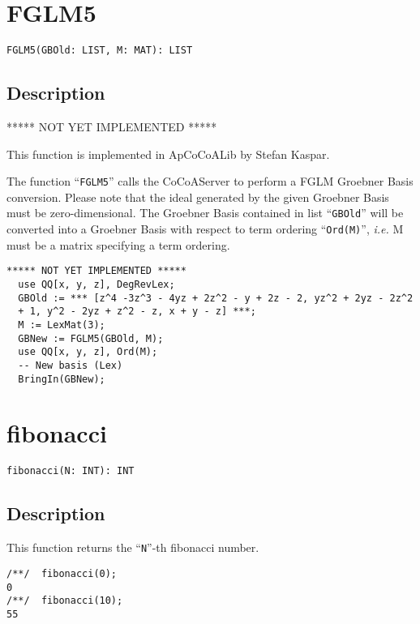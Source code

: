 \documentclass[a4paper]{mybook}
\newenvironment{command}{}{} %
\begin{document}
\section{FGLM5}
\label{FGLM5}
\begin{command} %


\begin{Verbatim}[label=syntax, rulecolor=\color{MidnightBlue},
frame=single]
FGLM5(GBOld: LIST, M: MAT): LIST
\end{Verbatim}


\subsection*{Description}

***** NOT YET IMPLEMENTED *****
\par 
This function is implemented in ApCoCoALib by Stefan Kaspar.
\par 
The function ``\verb&FGLM5&'' calls the CoCoAServer to perform a
FGLM Groebner Basis conversion.  Please note that the ideal generated
by the given Groebner Basis must be zero-dimensional.  The Groebner
Basis contained in list ``\verb&GBOld&'' will be converted into a Groebner Basis
with respect to term ordering ``\verb&Ord(M)&'', \textit{i.e.} M must be a matrix
specifying a term ordering.
\begin{Verbatim}[label=example, rulecolor=\color{PineGreen}, frame=single]
***** NOT YET IMPLEMENTED *****
  use QQ[x, y, z], DegRevLex;
  GBOld := *** [z^4 -3z^3 - 4yz + 2z^2 - y + 2z - 2, yz^2 + 2yz - 2z^2
  + 1, y^2 - 2yz + z^2 - z, x + y - z] ***;
  M := LexMat(3);
  GBNew := FGLM5(GBOld, M);
  use QQ[x, y, z], Ord(M);
  -- New basis (Lex)
  BringIn(GBNew);
\end{Verbatim}


\end{command} %

\section{fibonacci}
\label{fibonacci}
\begin{command} %


\begin{Verbatim}[label=syntax, rulecolor=\color{MidnightBlue},
frame=single]
fibonacci(N: INT): INT
\end{Verbatim}


\subsection*{Description}

This function returns the ``\verb&N&''-th fibonacci number.
\begin{Verbatim}[label=example, rulecolor=\color{PineGreen}, frame=single]
/**/  fibonacci(0);
0
/**/  fibonacci(10);
55
\end{Verbatim}


\end{command} %
\end{document}
